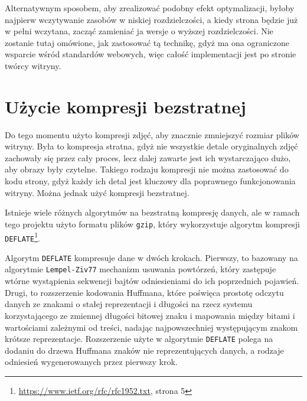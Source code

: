\documentclass[licencjacka]{pracadypl}
\begin{document}
Alternatywnym sposobem, aby zrealizować podobny efekt optymalizacji, byłoby najpierw wczytywanie zasobów w niskiej rozdzielczości, a kiedy strona będzie już w pełni wczytana, zacząć zamieniać ja wersje o wyższej rozdzielczości. Nie zostanie tutaj omówione, jak zastosować tą technikę, gdyż ma ona ograniczone wsparcie wśród standardów webowych, więc całość implementacji jest po stronie twórcy witryny.


\section{Użycie kompresji bezstratnej}

Do tego momentu użyto kompresji zdjęć, aby znacznie zmniejszyć rozmiar plików witryny. Była to kompresja stratna, gdyż nie wszystkie detale oryginalnych zdjęć zachowały się przez cały proces, lecz dalej zawarte jest ich wystarczająco dużo, aby obrazy były czytelne. Takiego rodzaju kompresji nie można zastosować do kodu strony, gdyż każdy ich detal jest kluczowy dla poprawnego funkcjonowania witryny. Można jednak użyć kompresji bezstratnej.

Istnieje wiele różnych algorytmów na bezstratną kompresję danych, ale w ramach tego projektu użyto formatu plików \texttt{gzip}, który wykorzystuje algorytm kompresji \texttt{DEFLATE}\footnote{\url{https://www.ietf.org/rfc/rfc1952.txt}, strona 5}.

Algorytm \texttt{DEFLATE} kompresuje dane w dwóch krokach. Pierwszy, to bazowany na algorytmie \texttt{Lempel-Ziv77} mechanizm usuwania powtórzeń, który zastępuje wtórne wystąpienia sekwencji bajtów odniesieniami do ich poprzednich pojawień. Drugi, to rozszerzenie kodowania Huffmana, które poświęca prostotę odczytu danych ze znakami o stałej reprezentacji i długości na rzecz systemu korzystającego ze zmiennej długości bitowej znaku i mapowania między bitami i wartościami zależnymi od treści, nadając najpowszechniej występującym znakom krótsze reprezentacje. Rozszerzenie użyte w algorytmie \texttt{DEFLATE} polega na dodaniu do drzewa Huffmana znaków nie reprezentujących danych, a rodzaje odniesień wygenerowanych przez pierwszy krok.
\end{document}

